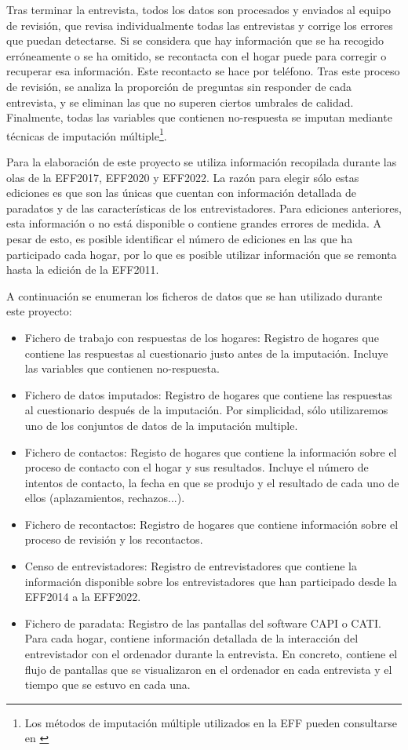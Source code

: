 Tras terminar la entrevista, todos los datos son procesados y enviados al equipo de revisión, que revisa individualmente todas las entrevistas y corrige los errores que puedan detectarse. Si se considera que hay información que se ha recogido erróneamente o se ha omitido, se recontacta con el hogar puede para corregir o recuperar esa información. Este recontacto se hace por teléfono. Tras este proceso de revisión, se analiza la proporción de preguntas sin responder de cada entrevista, y se eliminan las que no superen ciertos umbrales de calidad. Finalmente, todas las variables que contienen no-respuesta se imputan mediante técnicas de imputación múltiple\footnote{Los métodos de imputación múltiple utilizados en la EFF pueden consultarse en \cite{barcelo2006imputation}}.

Para la elaboración de este proyecto se utiliza información recopilada durante las olas de la EFF2017, EFF2020 y EFF2022. La razón para elegir sólo estas ediciones es que son las únicas que cuentan con información detallada de paradatos y de las características de los entrevistadores. Para ediciones anteriores, esta información o no está disponible o contiene grandes errores de medida. A pesar de esto, es posible identificar el número de ediciones en las que ha participado cada hogar, por lo que es posible utilizar información que se remonta hasta la edición de la EFF2011.

A continuación se enumeran los ficheros de datos que se han utilizado durante este proyecto:

\begin{itemize}
    \item Fichero de trabajo con respuestas de los hogares: Registro de hogares que contiene las respuestas al cuestionario justo antes de la imputación. Incluye las variables que contienen no-respuesta.
    \item Fichero de datos imputados: Registro de hogares que contiene las respuestas al cuestionario después de la imputación. Por simplicidad, sólo utilizaremos uno de los conjuntos de datos de la imputación multiple.
    \item Fichero de contactos: Registo de hogares que contiene la información sobre el proceso de contacto con el hogar y sus resultados. Incluye el número de intentos de contacto, la fecha en que se produjo y el resultado de cada uno de ellos (aplazamientos, rechazos...).
    \item Fichero de recontactos: Registro de hogares que contiene información sobre el proceso de revisión y los recontactos.
    \item Censo de entrevistadores: Registro de entrevistadores que contiene la información disponible sobre los entrevistadores que han participado desde la EFF2014 a la EFF2022.
    \item Fichero de paradata: Registro de las pantallas del software CAPI o CATI. Para cada hogar, contiene información detallada de la interacción del entrevistador con el ordenador durante la entrevista. En concreto, contiene el flujo de pantallas que se visualizaron en el ordenador en cada entrevista y el tiempo que se estuvo en cada una.
\end{itemize}

